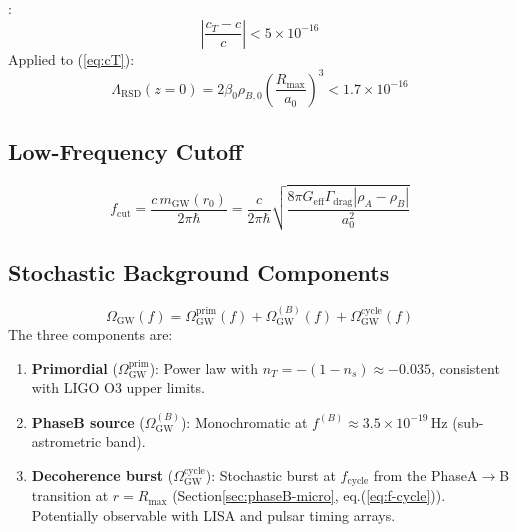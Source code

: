 \documentclass[10pt,twocolumn]{article}
\theoremstyle{definition}
\newcommand{\Rmax}{R_{\max}}
\newcommand{\rhoA}{\rho_{A}}
\newcommand{\rhoB}{\rho_{B}}
\newcommand{\Geff}{G_{\mathrm{eff}}}
\newcommand{\Gammadrag}{\Gamma_{\mathrm{drag}}}
\begin{document}
\citep{Abbott2017GW}:
\begin{equation}
  \left|\frac{c_{T}-c}{c}\right| < 5\times10^{-16}
\end{equation}
Applied to (\ref{eq:cT}):
\begin{equation}
  \Lambda_{\mathrm{RSD}}(z=0)
    = 2\beta_{0}\rho_{B,0}\left(\frac{\Rmax}{a_{0}}\right)^{3}
    < 1.7\times10^{-16}
  \label{eq:GW-constraint}
\end{equation}


\subsection{Low-Frequency Cutoff}

\begin{equation}
  f_{\mathrm{cut}}
    = \frac{c\,m_{\mathrm{GW}}(r_{0})}{2\pi\hbar}
    = \frac{c}{2\pi\hbar}
      \sqrt{\frac{8\pi\Geff\Gammadrag|\rhoA-\rhoB|}{a_{0}^{2}}}
  \label{eq:f-cut}
\end{equation}

\subsection{Stochastic Background Components}

\begin{equation}
  \Omega_{\mathrm{GW}}(f)
    = \Omega_{\mathrm{GW}}^{\mathrm{prim}}(f)
    + \Omega_{\mathrm{GW}}^{(B)}(f)
    + \Omega_{\mathrm{GW}}^{\mathrm{cycle}}(f)
  \label{eq:Omega-GW}
\end{equation}
The three components are:
\begin{enumerate}[label=(\roman*)]
  \item \textbf{Primordial} (\( \Omega_{\mathrm{GW}}^{\mathrm{prim}} \)):
    Power law with \( n_{T}=-(1-n_{s})\approx-0.035 \),
    consistent with LIGO O3 upper limits.
  \item \textbf{Phase\nobreakspace{}B source} (\( \Omega_{\mathrm{GW}}^{(B)} \)):
    Monochromatic at $f^{(B)}\approx3.5\times10^{-19}\,
    \mathrm{Hz}$ (sub-astrometric band).
  \item \textbf{Decoherence burst} (\( \Omega_{\mathrm{GW}}^{\mathrm{cycle}} \)):
    Stochastic burst at \( f_{\mathrm{cycle}} \) from the
    Phase\nobreakspace{}A$\to$B transition at \( r=\Rmax \)
    (Section\nobreakspace{}\ref{sec:phaseB-micro}, eq.\nobreakspace{}(\ref{eq:f-cycle})).
    Potentially observable with LISA and pulsar timing
    arrays.
\end{enumerate}
\end{document}
